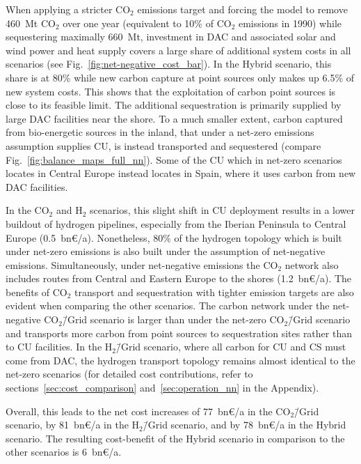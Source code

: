 \documentclass[twocolumn]{article}
\newcommand{\carbon}{CO$_2$}
\newcommand{\hydrogen}{H$_2$}
\newcommand{\carbonscenario}{CO$_2$\=/Grid scenario}
\newcommand{\hydrogenscenario}{H$_2$\=/Grid scenario}
\newcommand{\hybridscenario}{Hybrid scenario}
\begin{document}
When applying a stricter \carbon{} emissions target and forcing the model to remove 460~Mt \carbon{} over one year (equivalent to 10\% of \carbon{} emissions in 1990) while sequestering maximally 660~Mt, investment in DAC and associated solar and wind power and heat supply covers a large share of additional system costs in all scenarios (see Fig.~\ref{fig:net-negative_cost_bar}). In the \hybridscenario{}, this share is at 80\% while new carbon capture at point sources only makes up 6.5\% of new system costs. This shows that the exploitation of carbon point sources is close to its feasible limit. The additional sequestration is primarily supplied by large DAC facilities near the shore. To a much smaller extent, carbon captured from bio-energetic sources in the inland, that under a net-zero emissions assumption supplies CU, is instead transported and sequestered (compare Fig.~\ref{fig:balance_maps_full_nn}). Some of the CU which in net-zero scenarios locates in Central Europe instead locates in Spain, where it uses carbon from new DAC facilities.


In the \carbon{} and \hydrogen{} scenarios, this slight shift in CU deployment results in a lower buildout of hydrogen pipelines, especially from the Iberian Peninsula to Central Europe (0.5~bn€/a). Nonetheless, 80\% of the hydrogen topology which is built under net-zero emissions is also built under the assumption of net-negative emissions. Simultaneously, under net-negative emissions the \carbon{} network also includes routes from Central and Eastern Europe to the shores (1.2~bn€/a). The benefits of \carbon{} transport and sequestration with tighter emission targets are also evident when comparing the other scenarios. The carbon network under the net-negative \carbonscenario{} is larger than under the net-zero \carbonscenario{} and transports more carbon from point sources to sequestration sites rather than to CU facilities. In the \hydrogenscenario{}, where all carbon for CU and CS must come from DAC, the hydrogen transport topology remains almost identical to the net-zero scenarios (for detailed cost contributions, refer to sections~\ref{sec:cost_comparison} and~\ref{sec:operation_nn} in the Appendix).

Overall, this leads to the net cost increases of 77~bn€/a in the \carbonscenario{}, by 81~bn€/a in the \hydrogenscenario{}, and by 78~bn€/a in the \hybridscenario{}. The resulting cost-benefit of the \hybridscenario{} in comparison to the other scenarios is 6~bn€/a.
\end{document}
